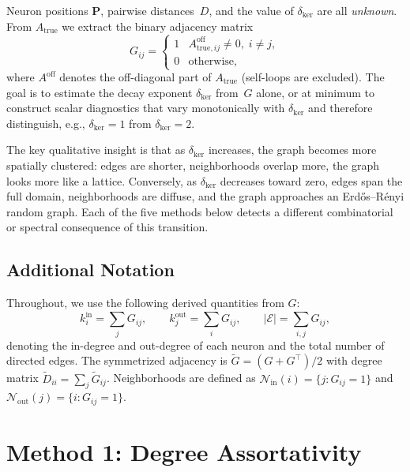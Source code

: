 \documentclass[11pt]{article}
\begin{document}
Neuron positions
$\mathbf{P}$, pairwise distances~$D$, and the value of
$\delta_{\mathrm{ker}}$ are all \emph{unknown}.  From
$A_{\mathrm{true}}$ we extract the binary adjacency matrix
\begin{equation}
  G_{ij} =
  \begin{cases}
    1 & A_{\mathrm{true},ij}^{\mathrm{off}}\neq 0,\;i\neq j,\\
    0 & \text{otherwise},
  \end{cases}
  \label{eq:adjacency}
\end{equation}
where $A^{\mathrm{off}}$ denotes the off-diagonal part of
$A_{\mathrm{true}}$ (self-loops are excluded).  The goal is to
estimate the decay exponent $\delta_{\mathrm{ker}}$ from~$G$ alone, or
at minimum to construct scalar diagnostics that vary monotonically
with $\delta_{\mathrm{ker}}$ and therefore distinguish, e.g.,
$\delta_{\mathrm{ker}}=1$ from $\delta_{\mathrm{ker}}=2$.

The key qualitative insight is that as $\delta_{\mathrm{ker}}$
increases, the graph becomes more spatially clustered: edges are
shorter, neighborhoods overlap more, the graph looks more like a
lattice.  Conversely, as $\delta_{\mathrm{ker}}$ decreases toward
zero, edges span the full domain, neighborhoods are diffuse, and the
graph approaches an Erd\H{o}s--R\'enyi random graph.  Each of the five
methods below detects a different combinatorial or spectral
consequence of this transition.

\subsection{Additional Notation}

Throughout, we use the following derived quantities from $G$:
\begin{equation}
  k_i^{\mathrm{in}}  = \sum_{j} G_{ij}, \qquad
  k_j^{\mathrm{out}} = \sum_{i} G_{ij}, \qquad
  |\mathcal{E}| = \sum_{i,j} G_{ij},
\end{equation}
denoting the in-degree and out-degree of each neuron and the total
number of directed edges.  The symmetrized adjacency is
$\tilde{G}=(G+G^{\!\top})/2$ with degree matrix
$\tilde{D}_{ii}=\sum_j\tilde{G}_{ij}$.  Neighborhoods are defined as
$\mathcal{N}_{\mathrm{in}}(i)=\{j:G_{ij}=1\}$ and
$\mathcal{N}_{\mathrm{out}}(j)=\{i:G_{ij}=1\}$.


\section{Method 1: Degree Assortativity}
\label{sec:assortativity}
\end{document}
